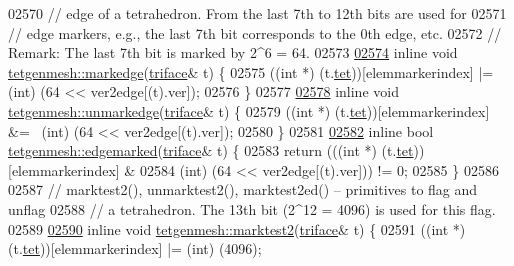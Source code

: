 \begin{DoxyCode}
02570 \textcolor{comment}{//   edge of a tetrahedron.  From the last 7th to 12th bits are used for}
02571 \textcolor{comment}{//   edge markers, e.g., the last 7th bit corresponds to the 0th edge, etc. }
02572 \textcolor{comment}{//   Remark: The last 7th bit is marked by 2^6 = 64.}
02573 
\hypertarget{tetgen_8h_source.tex_l02574}{}\hyperlink{classtetgenmesh_a82b69f60b4dec0ec3623c79c864db274}{02574} \textcolor{keyword}{inline} \textcolor{keywordtype}{void} \hyperlink{classtetgenmesh_a82b69f60b4dec0ec3623c79c864db274}{tetgenmesh::markedge}(\hyperlink{classtetgenmesh_1_1triface}{triface}& t) \{
02575   ((\textcolor{keywordtype}{int} *) (t.\hyperlink{classtetgenmesh_1_1triface_ad3b174c4040b18a5286ddfeb8db02529}{tet}))[elemmarkerindex] |= (\textcolor{keywordtype}{int}) (64 << ver2edge[(t).ver]);
02576 \}
02577 
\hypertarget{tetgen_8h_source.tex_l02578}{}\hyperlink{classtetgenmesh_a8dec14c1e587c3a2312fbadcfcc74f01}{02578} \textcolor{keyword}{inline} \textcolor{keywordtype}{void} \hyperlink{classtetgenmesh_a8dec14c1e587c3a2312fbadcfcc74f01}{tetgenmesh::unmarkedge}(\hyperlink{classtetgenmesh_1_1triface}{triface}& t) \{
02579   ((\textcolor{keywordtype}{int} *) (t.\hyperlink{classtetgenmesh_1_1triface_ad3b174c4040b18a5286ddfeb8db02529}{tet}))[elemmarkerindex] &= ~(\textcolor{keywordtype}{int}) (64 << ver2edge[(t).ver]);
02580 \}
02581 
\hypertarget{tetgen_8h_source.tex_l02582}{}\hyperlink{classtetgenmesh_ae4c94b6cfaa4a4c0e1919a8200cb1db4}{02582} \textcolor{keyword}{inline} \textcolor{keywordtype}{bool} \hyperlink{classtetgenmesh_ae4c94b6cfaa4a4c0e1919a8200cb1db4}{tetgenmesh::edgemarked}(\hyperlink{classtetgenmesh_1_1triface}{triface}& t) \{
02583   \textcolor{keywordflow}{return} (((\textcolor{keywordtype}{int} *) (t.\hyperlink{classtetgenmesh_1_1triface_ad3b174c4040b18a5286ddfeb8db02529}{tet}))[elemmarkerindex] & 
02584            (\textcolor{keywordtype}{int}) (64 << ver2edge[(t).ver])) != 0;
02585 \}
02586 
02587 \textcolor{comment}{// marktest2(), unmarktest2(), marktest2ed() -- primitives to flag and unflag}
02588 \textcolor{comment}{//   a tetrahedron. The 13th bit (2^12 = 4096) is used for this flag.}
02589 
\hypertarget{tetgen_8h_source.tex_l02590}{}\hyperlink{classtetgenmesh_aaeb2fae51d48efe3b6b320194a555177}{02590} \textcolor{keyword}{inline} \textcolor{keywordtype}{void} \hyperlink{classtetgenmesh_aaeb2fae51d48efe3b6b320194a555177}{tetgenmesh::marktest2}(\hyperlink{classtetgenmesh_1_1triface}{triface}& t) \{
02591   ((\textcolor{keywordtype}{int} *) (t.\hyperlink{classtetgenmesh_1_1triface_ad3b174c4040b18a5286ddfeb8db02529}{tet}))[elemmarkerindex] |= (\textcolor{keywordtype}{int}) (4096);

\end{DoxyCode}
